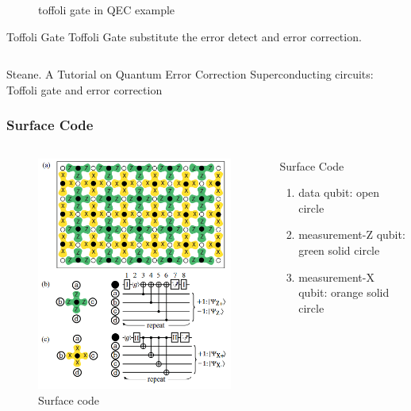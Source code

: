 \documentclass[aspectratio=169,10pt]{beamer}
\begin{document}
\begin{frame}
\begin{columns}
\begin{column}{0.5\textwidth}
\begin{figure}
            \caption{toffoli gate in QEC example}
        \end{figure}
        \begin{block}{Toffoli Gate}
            Toffoli Gate substitute the error detect and error correction.    
        \end{block}
        \end{column}
    \end{columns}
\tiny{Steane. A Tutorial on Quantum Error Correction}
\tiny{Superconducting circuits: Toffoli gate and error correction}
\end{frame}
\begin{frame}
    \frametitle{Surface Code}
    \begin{columns}
        \begin{column}{0.38\textwidth}
            \begin{figure}
                \includegraphics[width=\columnwidth]{figure/surfacecode.png}
                \caption{Surface code}
            \end{figure}
        \end{column}
        \begin{column}{0.6\textwidth}
            \begin{block}{Surface Code}
            \begin{enumerate}
                \item data qubit: open circle
                \item measurement-Z qubit: green solid circle
                \item measurement-X qubit: orange solid circle
            \end{enumerate}


\end{block}
\end{column}
\end{columns}
\end{frame}
\end{document}
